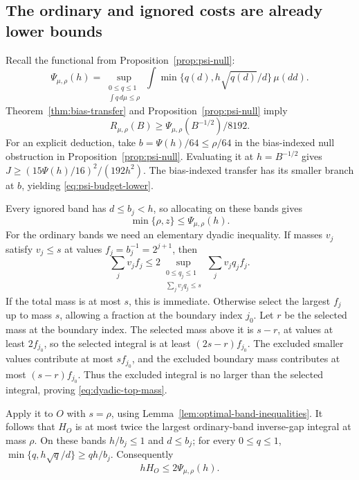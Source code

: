 \subsection{The ordinary and ignored costs are already lower bounds}

Recall the functional from Proposition~\ref{prop:psi-null}:
\[
 \Psi_{\mu,\rho}(h)=
 \sup_{\substack{0\le q\le1\\\int q\,d\mu\le\rho}}
 \int\min\{q(d),h\sqrt{q(d)}/d\}\,\mu(dd).
\]
Theorem~\ref{thm:bias-transfer} and Proposition~\ref{prop:psi-null} imply
\begin{equation}\label{eq:psi-budget-lower}
 R_{\mu,\rho}(B)\ge\Psi_{\mu,\rho}(B^{-1/2})/8192.
\end{equation}
For an explicit deduction, take $b=\Psi(h)/64\le\rho/64$ in the
bias-indexed null obstruction in Proposition~\ref{prop:psi-null}. Evaluating it at
$h=B^{-1/2}$ gives
$J\ge(15\Psi(h)/16)^2/(192h^2)$.
The bias-indexed transfer has its smaller branch at $b$, yielding
\eqref{eq:psi-budget-lower}.

Every ignored band has $d\le b_j<h$, so allocating on these bands gives
\begin{equation}\label{eq:ignored-psi}
 \min\{\rho,z\}\le\Psi_{\mu,\rho}(h).
\end{equation}
For the ordinary bands we need an elementary dyadic inequality.
If masses $v_j$ satisfy $v_j\le s$ at values
$f_j=b_j^{-1}=2^{j+1}$, then
\begin{equation}\label{eq:dyadic-top-mass}
 \sum_jv_jf_j\le2
 \sup_{\substack{0\le q_j\le1\\\sum_jv_jq_j\le s}}
                 \sum_jv_jq_jf_j.
\end{equation}
If the total mass is at most $s$, this is immediate. Otherwise select
the largest $f_j$ up to mass $s$, allowing a fraction at the boundary
index $j_0$. Let $r$ be the selected mass at the boundary index.
The selected mass above it is $s-r$, at values at least $2f_{j_0}$,
so the selected integral is at least $(2s-r)f_{j_0}$.
The excluded smaller values contribute at most $sf_{j_0}$, and the
excluded boundary mass contributes at most $(s-r)f_{j_0}$.
Thus the excluded integral is no larger than the selected integral,
proving \eqref{eq:dyadic-top-mass}.

Apply it to $O$ with $s=\rho$, using
Lemma~\ref{lem:optimal-band-inequalities}. It follows that $H_O$ is at
most twice the largest ordinary-band inverse-gap integral at mass $\rho$.
On these bands $h/b_j\le1$ and $d\le b_j$;
for every $0\le q\le1$,
$\min\{q,h\sqrt q/d\}\ge qh/b_j$.
Consequently
\begin{equation}\label{eq:ordinary-psi}
 hH_O\le2\Psi_{\mu,\rho}(h).
\end{equation}

